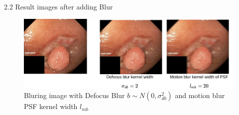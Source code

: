 \documentclass{libs/ufc_format}
\begin{document}
\begin{frame}{2.2 Result images after adding Blur}






    \begin{figure}
        \centering
        \includegraphics[width=1\textwidth]{libs/bluraddres2.png}
        \caption{Bluring image with Defocus Blur $b \sim N(0, \sigma^2_{db})$ and motion blur PSF kernel width $l_{mb}$}
        \label{blur_inpainted}
    \end{figure}
\end{frame}
\end{document}
